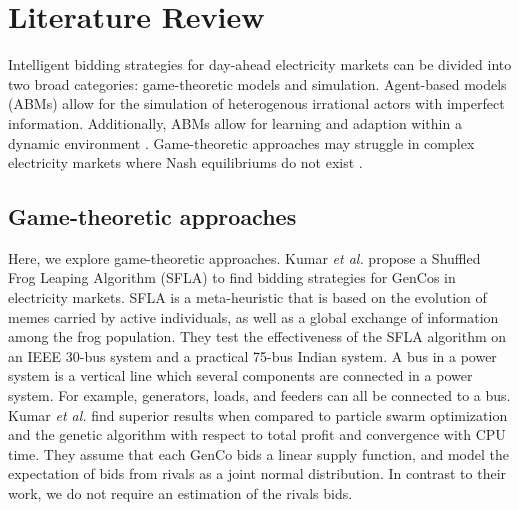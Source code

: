 









\section{Literature Review}
\label{rl:sec:lit-review}

Intelligent bidding strategies for day-ahead electricity markets can be divided into two broad categories: game-theoretic models and simulation. Agent-based models (ABMs) allow for the simulation of heterogenous irrational actors with imperfect information. Additionally, ABMs allow for learning and adaption within a dynamic environment \cite{EsmaeiliAliabadi2017}. Game-theoretic approaches may struggle in complex electricity markets where Nash equilibriums do not exist \cite{Wang2011}.

\subsection{Game-theoretic approaches}

Here, we explore game-theoretic approaches. Kumar \textit{et al.} propose a Shuffled Frog Leaping Algorithm (SFLA) \cite{VijayaKumar2014} to find bidding strategies for GenCos in electricity markets. SFLA is a meta-heuristic that is based on the evolution of memes carried by active individuals, as well as a global exchange of information among the frog population. They test the effectiveness of the SFLA algorithm on an IEEE 30-bus system and a practical 75-bus Indian system. A bus in a power system is a vertical line which several components are connected in a power system. For example, generators, loads, and feeders can all be connected to a bus. Kumar \textit{et al.} find superior results when compared to particle swarm optimization and the genetic algorithm with respect to total profit and convergence with CPU time. They assume that each GenCo bids a linear supply function, and model the expectation of bids from rivals as a joint normal distribution. In contrast to their work, we do not require an estimation of the rivals bids.

